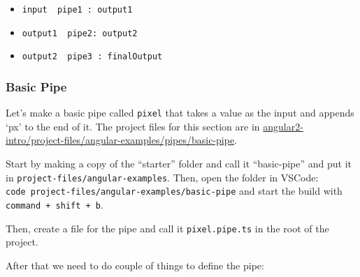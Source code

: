 \documentclass[12pt,]{article}
\providecommand{\tightlist}{%
  \setlength{\itemsep}{0pt}\setlength{\parskip}{0pt}}
\begin{document}
\begin{itemize}
  \begin{itemize}
  \tightlist
  \item
    \texttt{input\ \textbar{}\ pipe1\ :\ output1}
  \item
    \texttt{output1\ \textbar{}\ pipe2:\ output2}
  \item
    \texttt{output2\ \textbar{}\ pipe3\ :\ finalOutput}
  \end{itemize}
\end{itemize}

\subsubsection{Basic Pipe}\label{basic-pipe}

Let's make a basic pipe called \texttt{pixel} that takes a value as the
input and appends `px' to the end of it. The project files for this
section are in
\href{https://github.com/st32lth/angular2-intro/tree/master/project-files/angular-examples/pipes/basic-pipe}{angular2-intro/project-files/angular-examples/pipes/basic-pipe}.

Start by making a copy of the ``starter'' folder and call it
``basic-pipe'' and put it in \texttt{project-files/angular-examples}.
Then, open the folder in VSCode:
\texttt{code\ project-files/angular-examples/basic-pipe} and start the
build with \texttt{command\ +\ shift\ +\ b}.

Then, create a file for the pipe and call it \texttt{pixel.pipe.ts} in
the root of the project.

After that we need to do couple of things to define the pipe:
\end{document}
